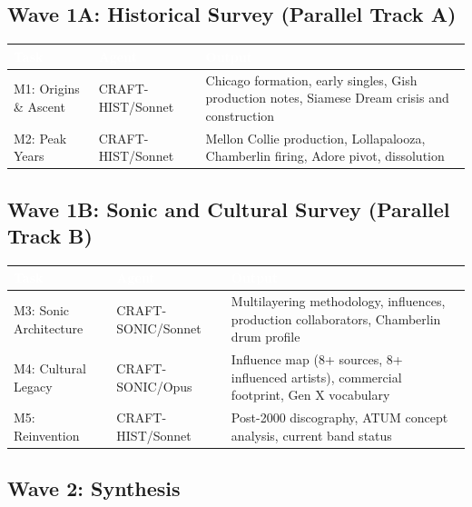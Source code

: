 \documentclass[11pt,letterpaper]{article}
\newcommand{\tableheader}[1]{\textbf{\sffamily\textcolor{white}{#1}}}
\begin{document}
\subsection{Wave 1A: Historical Survey (Parallel Track A)}

\begin{center}
\begin{tabularx}{\textwidth}{L{3cm}L{2.5cm}X}
\toprule
{}
\tableheader{Task} & \tableheader{Agent} & \tableheader{Output} \\
\midrule
M1: Origins \& Ascent & CRAFT-HIST/Sonnet & Chicago formation, early singles, Gish production notes, Siamese Dream crisis and construction \\
M2: Peak Years & CRAFT-HIST/Sonnet & Mellon Collie production, Lollapalooza, Chamberlin firing, Adore pivot, dissolution \\
\bottomrule
\end{tabularx}
\end{center}

\subsection{Wave 1B: Sonic and Cultural Survey (Parallel Track B)}

\begin{center}
\begin{tabularx}{\textwidth}{L{3cm}L{2.5cm}X}
\toprule
{}
\tableheader{Task} & \tableheader{Agent} & \tableheader{Output} \\
\midrule
M3: Sonic Architecture & CRAFT-SONIC/Sonnet & Multilayering methodology, influences, production collaborators, Chamberlin drum profile \\
M4: Cultural Legacy & CRAFT-SONIC/Opus & Influence map (8+ sources, 8+ influenced artists), commercial footprint, Gen X vocabulary \\
M5: Reinvention & CRAFT-HIST/Sonnet & Post-2000 discography, ATUM concept analysis, current band status \\
\bottomrule
\end{tabularx}
\end{center}

\subsection{Wave 2: Synthesis}
\end{document}
